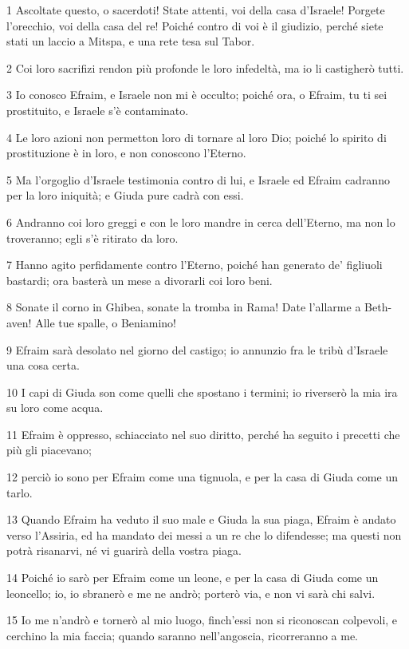\par 1 Ascoltate questo, o sacerdoti! State attenti, voi della casa d'Israele! Porgete l'orecchio, voi della casa del re! Poiché contro di voi è il giudizio, perché siete stati un laccio a Mitspa, e una rete tesa sul Tabor.
\par 2 Coi loro sacrifizi rendon più profonde le loro infedeltà, ma io li castigherò tutti.
\par 3 Io conosco Efraim, e Israele non mi è occulto; poiché ora, o Efraim, tu ti sei prostituito, e Israele s'è contaminato.
\par 4 Le loro azioni non permetton loro di tornare al loro Dio; poiché lo spirito di prostituzione è in loro, e non conoscono l'Eterno.
\par 5 Ma l'orgoglio d'Israele testimonia contro di lui, e Israele ed Efraim cadranno per la loro iniquità; e Giuda pure cadrà con essi.
\par 6 Andranno coi loro greggi e con le loro mandre in cerca dell'Eterno, ma non lo troveranno; egli s'è ritirato da loro.
\par 7 Hanno agito perfidamente contro l'Eterno, poiché han generato de' figliuoli bastardi; ora basterà un mese a divorarli coi loro beni.
\par 8 Sonate il corno in Ghibea, sonate la tromba in Rama! Date l'allarme a Beth-aven! Alle tue spalle, o Beniamino!
\par 9 Efraim sarà desolato nel giorno del castigo; io annunzio fra le tribù d'Israele una cosa certa.
\par 10 I capi di Giuda son come quelli che spostano i termini; io riverserò la mia ira su loro come acqua.
\par 11 Efraim è oppresso, schiacciato nel suo diritto, perché ha seguito i precetti che più gli piacevano;
\par 12 perciò io sono per Efraim come una tignuola, e per la casa di Giuda come un tarlo.
\par 13 Quando Efraim ha veduto il suo male e Giuda la sua piaga, Efraim è andato verso l'Assiria, ed ha mandato dei messi a un re che lo difendesse; ma questi non potrà risanarvi, né vi guarirà della vostra piaga.
\par 14 Poiché io sarò per Efraim come un leone, e per la casa di Giuda come un leoncello; io, io sbranerò e me ne andrò; porterò via, e non vi sarà chi salvi.
\par 15 Io me n'andrò e tornerò al mio luogo, finch'essi non si riconoscan colpevoli, e cerchino la mia faccia; quando saranno nell'angoscia, ricorreranno a me.

